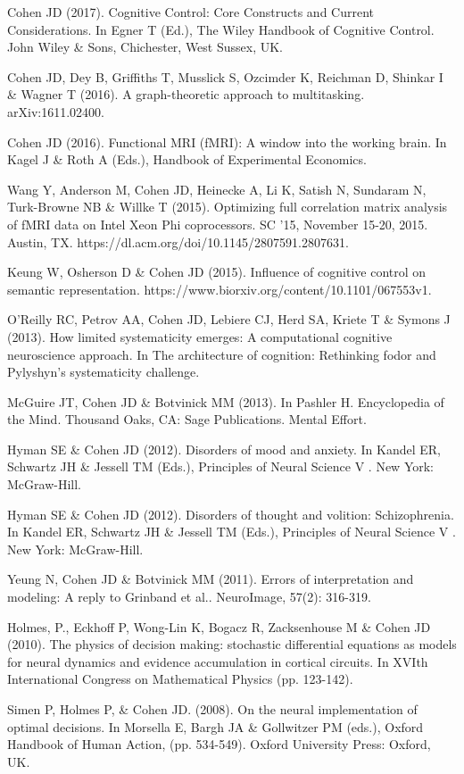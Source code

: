\documentclass[10 pt]{article}
\begin{document}
Cohen JD (2017). Cognitive Control: Core Constructs and Current Considerations. In Egner T (Ed.), The Wiley Handbook of Cognitive Control. John Wiley \& Sons, Chichester, West Sussex, UK.

Cohen JD, Dey B, Griffiths T, Musslick S, Ozcimder K, Reichman D, Shinkar I \& Wagner T (2016). A graph-theoretic approach to multitasking. arXiv:1611.02400.

Cohen JD (2016). Functional MRI (fMRI): A window into the working brain. In Kagel J \& Roth A (Eds.), Handbook of Experimental Economics.

Wang Y, Anderson M, Cohen JD, Heinecke A, Li K, Satish N, Sundaram N, Turk-Browne NB \& Willke T (2015). Optimizing full correlation matrix analysis of fMRI data on Intel Xeon Phi coprocessors. SC ’15, November 15-20, 2015. Austin, TX. https://dl.acm.org/doi/10.1145/2807591.2807631.

Keung W, Osherson D \& Cohen JD (2015). Influence of cognitive control on semantic representation. https://www.biorxiv.org/content/10.1101/067553v1.

O’Reilly RC, Petrov AA, Cohen JD, Lebiere CJ, Herd SA, Kriete T \& Symons J (2013). How limited systematicity emerges: A computational cognitive neuroscience approach. In The architecture of cognition: Rethinking fodor and Pylyshyn's systematicity challenge.

McGuire JT, Cohen JD \& Botvinick MM (2013). In Pashler H. Encyclopedia of the Mind. Thousand Oaks, CA: Sage Publications. Mental Effort.

Hyman SE \& Cohen JD (2012). Disorders of mood and anxiety. In Kandel ER, Schwartz JH \& Jessell TM (Eds.), Principles of Neural Science V . New York: McGraw-Hill.

Hyman SE \& Cohen JD (2012). Disorders of thought and volition: Schizophrenia. In Kandel ER, Schwartz JH \& Jessell TM (Eds.), Principles of Neural Science V . New York: McGraw-Hill.

Yeung N, Cohen JD \& Botvinick MM (2011). Errors of interpretation and modeling: A reply to Grinband et al.. NeuroImage, 57(2): 316-319.

Holmes, P., Eckhoff P, Wong-Lin K, Bogacz R, Zacksenhouse M \& Cohen JD (2010). The physics of decision making: stochastic differential equations as models for neural dynamics and evidence accumulation in cortical circuits. In XVIth International Congress on Mathematical Physics (pp. 123-142).

Simen P, Holmes P, \& Cohen JD. (2008). On the neural implementation of optimal decisions. In Morsella E, Bargh JA \& Gollwitzer PM (eds.), Oxford Handbook of Human Action, (pp. 534-549). Oxford University Press: Oxford, UK.
\end{document}
